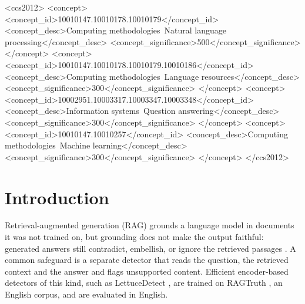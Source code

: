 \documentclass[manuscript,screen,review]{acmart}
\begin{document}
\begin{CCSXML}
<ccs2012>
   <concept>
       <concept_id>10010147.10010178.10010179</concept_id>
       <concept_desc>Computing methodologies~Natural language processing</concept_desc>
       <concept_significance>500</concept_significance>
       </concept>
   <concept>
       <concept_id>10010147.10010178.10010179.10010186</concept_id>
       <concept_desc>Computing methodologies~Language resources</concept_desc>
       <concept_significance>300</concept_significance>
       </concept>
   <concept>
       <concept_id>10002951.10003317.10003347.10003348</concept_id>
       <concept_desc>Information systems~Question answering</concept_desc>
       <concept_significance>300</concept_significance>
       </concept>
   <concept>
       <concept_id>10010147.10010257</concept_id>
       <concept_desc>Computing methodologies~Machine learning</concept_desc>
       <concept_significance>300</concept_significance>
       </concept>
 </ccs2012>
\end{CCSXML}



\maketitle

\section{Introduction}
Retrieval-augmented generation (RAG) \cite{lewis2020rag} grounds a language model in documents it was not trained on, but grounding does not make the output faithful: generated answers still contradict, embellish, or ignore the retrieved passages \cite{ji2023survey,huang2025survey}. A common safeguard is a separate detector that reads the question, the retrieved context and the answer and flags unsupported content. Efficient encoder-based detectors of this kind, such as LettuceDetect \cite{kovacs2025lettucedetect}, are trained on RAGTruth \cite{niu2024ragtruth}, an English corpus, and are evaluated in English.
\end{document}

